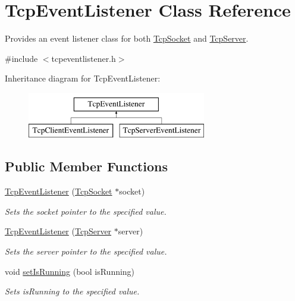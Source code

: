 \hypertarget{class_tcp_event_listener}{}\section{Tcp\+Event\+Listener Class Reference}
\label{class_tcp_event_listener}


Provides an event listener class for both \mbox{\hyperlink{class_tcp_socket}{Tcp\+Socket}} and \mbox{\hyperlink{class_tcp_server}{Tcp\+Server}}.  




{\ttfamily \#include $<$tcpeventlistener.\+h$>$}

Inheritance diagram for Tcp\+Event\+Listener\+:\begin{figure}[H]
\begin{center}
\leavevmode
\includegraphics[height=2.000000cm]{class_tcp_event_listener}
\end{center}
\end{figure}
\subsection*{Public Member Functions}
\begin{DoxyCompactItemize}
\item 
\mbox{\hyperlink{class_tcp_event_listener_a3d6f7243d828830ed9373a2e488c95b6}{Tcp\+Event\+Listener}} (\mbox{\hyperlink{class_tcp_socket}{Tcp\+Socket}} $\ast$socket)
\begin{DoxyCompactList}\small\item\em Sets the socket pointer to the specified value. \end{DoxyCompactList}\item 
\mbox{\hyperlink{class_tcp_event_listener_aba0cb36a5016a7c081b277ff4030fbf6}{Tcp\+Event\+Listener}} (\mbox{\hyperlink{class_tcp_server}{Tcp\+Server}} $\ast$server)
\begin{DoxyCompactList}\small\item\em Sets the server pointer to the specified value. \end{DoxyCompactList}\item 
void \mbox{\hyperlink{class_tcp_event_listener_aac35550b2da7ba7b4f27e8dd169a436b}{set\+Is\+Running}} (bool is\+Running)
\begin{DoxyCompactList}\small\item\em Sets is\+Running to the specified value. \end{DoxyCompactList}\end{DoxyCompactItemize}
